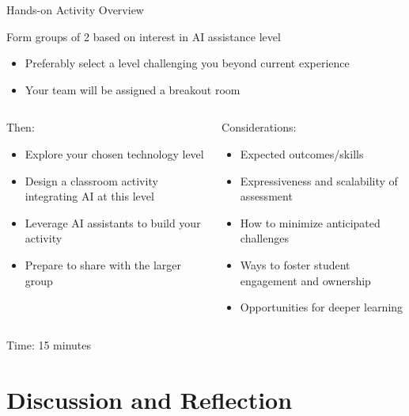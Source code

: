 \documentclass[xcolor=dvipsnames, aspectratio=169]{beamer}
\begin{document}
\begin{frame}{Hands-on Activity Overview}
  

  Form groups of 2 based on interest in AI assistance level
  \begin{itemize}
    \item Preferably select a level challenging you beyond current experience
    \item Your team will be assigned a breakout room
  \end{itemize}
  
  \begin{columns}
    \begin{column}{0.5\textwidth}
      Then:
      \begin{itemize}
        \item Explore your chosen technology level
        \item Design a classroom activity integrating AI at this level
        \item Leverage AI assistants to build your activity
        \item Prepare to share with the larger group
      \end{itemize}
    \end{column}
    
    \begin{column}{0.5\textwidth}
      Considerations:
      \begin{itemize}
        \item Expected outcomes/skills
        \item Expressiveness and scalability of assessment
        \item How to minimize anticipated challenges
        \item Ways to foster student engagement and ownership
        \item Opportunities for deeper learning
      \end{itemize}
    \end{column}
  \end{columns}

  \begin{alertbox}
      Time: 15 minutes
  \end{alertbox}  
\end{frame}

\part[Discussion and Reflection]{Discussion and Reflection}
\end{document}
